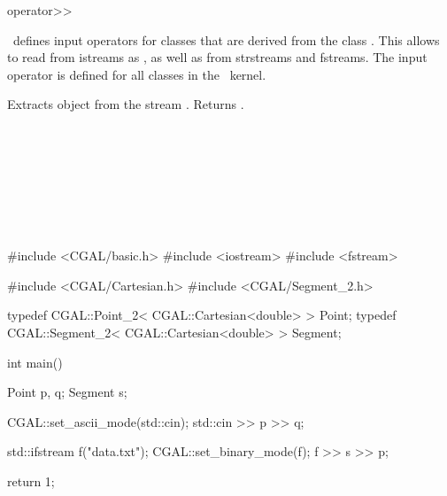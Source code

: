 

\begin{ccRefFunction}{operator>>}  %


\ccDefinition
\cgal\  defines input operators for classes that are derived
from the class . This allows to read from istreams
as , as well as from strstreams and fstreams.
The input operator is defined for all classes in the \cgal\ kernel.


   {Extracts object  from the stream . Returns .}           
\ccSeeAlso
{} \\
 \\
  \\
  \\
 \\
 \\
 \\
 \\

\ccExample
\begin{cprog}

#include <CGAL/basic.h>
#include <iostream>
#include <fstream>

#include <CGAL/Cartesian.h>
#include <CGAL/Segment_2.h>

typedef CGAL::Point_2< CGAL::Cartesian<double> >     Point;
typedef CGAL::Segment_2< CGAL::Cartesian<double> >   Segment;

int
main()
{
    Point p, q;
    Segment s;

    CGAL::set_ascii_mode(std::cin);
    std::cin >> p >> q;

    std::ifstream f("data.txt");
    CGAL::set_binary_mode(f);
    f >> s >> p;

    return 1;
}
\end{cprog} 

\end{ccRefFunction}


